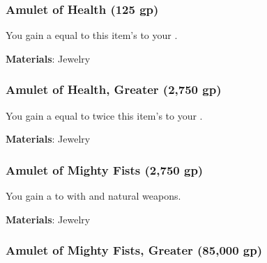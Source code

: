 
\lowercase{\hypertarget{item:Amulet of Health}{}}\label{item:Amulet of Health}
\hypertarget{item:Amulet of Health}{\subsubsection{Amulet of Health\hfill{} (125 gp)}}

You gain a  equal to this item's  to your .



\vspace{0.25em}
\textbf{Materials}: Jewelry


\lowercase{\hypertarget{item:Amulet of Health, Greater}{}}\label{item:Amulet of Health, Greater}
\hypertarget{item:Amulet of Health, Greater}{\subsubsection{Amulet of Health, Greater\hfill{} (2,750 gp)}}

You gain a  equal to twice this item's  to your .



\vspace{0.25em}
\textbf{Materials}: Jewelry


\lowercase{\hypertarget{item:Amulet of Mighty Fists}{}}\label{item:Amulet of Mighty Fists}
\hypertarget{item:Amulet of Mighty Fists}{\subsubsection{Amulet of Mighty Fists\hfill{} (2,750 gp)}}

You gain a   to  with  and natural weapons.



\vspace{0.25em}
\textbf{Materials}: Jewelry


\lowercase{\hypertarget{item:Amulet of Mighty Fists, Greater}{}}\label{item:Amulet of Mighty Fists, Greater}
\hypertarget{item:Amulet of Mighty Fists, Greater}{\subsubsection{Amulet of Mighty Fists, Greater\hfill{} (85,000 gp)}}

